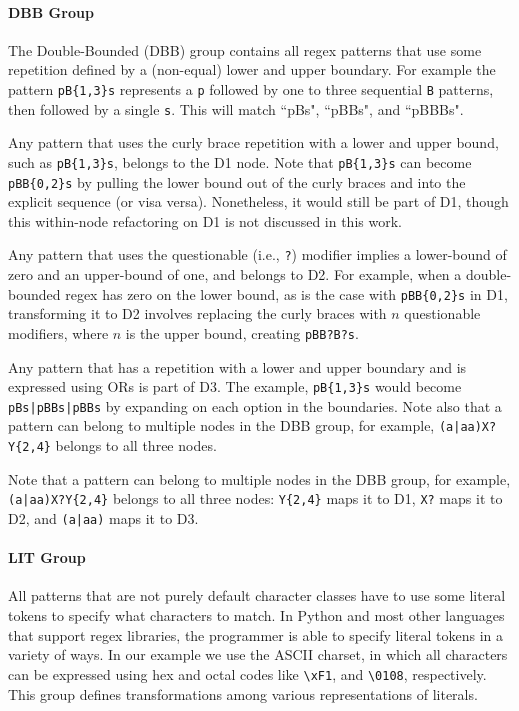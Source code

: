 \paragraph{DBB Group}
The Double-Bounded (DBB) group contains all regex patterns that use some repetition defined by a (non-equal) lower and upper boundary.  For example the pattern \verb!pB{1,3}s! represents a \verb!p! followed by one to three sequential \verb!B! patterns, then followed by a single \verb!s!.  This will match ``pBs", ``pBBs", and ``pBBBs".

\begin{description}  \itemsep -1pt
\item[D1:] Any pattern that  uses the curly brace repetition with a lower and upper bound, such as  \verb!pB{1,3}s!, belongs to the D1 node.
Note that  \verb!pB{1,3}s! can become \verb!pBB{0,2}s! by pulling the lower bound out of the curly braces and into the explicit sequence (or visa versa). Nonetheless, it would still be part of D1, though this within-node refactoring on D1 is not discussed in this work.
\item[D2:] Any pattern that uses the questionable (i.e., \verb!?!) modifier implies a lower-bound of zero and an upper-bound of one, and belongs to D2. For example, when a double-bounded regex has zero on the lower bound, as is the case with \verb!pBB{0,2}s!  in D1, transforming it to D2 involves replacing the curly braces with $n$ questionable modifiers, where $n$ is the upper bound,  creating \verb!pBB?B?s!.
\item[D3:] Any pattern that has a repetition with a lower and upper boundary and is expressed using ORs is part of D3.  The example, \verb!pB{1,3}s! would become \verb!pBs|pBBs|pBBs! by expanding on each option in the boundaries.
Note also that a pattern can belong to multiple nodes in the DBB group, for example, \verb!(a|aa)X?Y{2,4}! belongs to all three nodes.
\end{description}

Note that a pattern can belong to multiple nodes in the DBB group, for example, \verb!(a|aa)X?Y{2,4}! belongs to all three nodes: \verb!Y{2,4}! maps it to D1, \verb!X?!  maps it to D2, and \verb!(a|aa)!  maps it to D3.

\paragraph{LIT Group}
All patterns that are not purely default character classes have to use some literal tokens to specify what characters to match.  In Python and most other languages that support regex libraries, the programmer is able to specify literal tokens in a variety of ways.  In our example we use the ASCII charset, in which all characters can be expressed using hex and octal codes like \verb!\xF1!, and \verb!\0108!, respectively.  This group defines transformations among various representations of literals.


